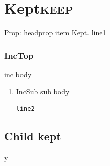 \section{Kept\hfill{}\textsc{keep}}
\label{sec:orge4dac33}
Prop: headprop item Kept.
line1
\subsubsection{IncTop}
\label{sec:orgf2ad226}
inc body
\begin{enumerate}
\item IncSub
\label{sec:orgcc36c5e}
sub body
\begin{verbatim}
line2
\end{verbatim}
\end{enumerate}
\subsection{Child kept}
\label{sec:orgad6d653}
y
